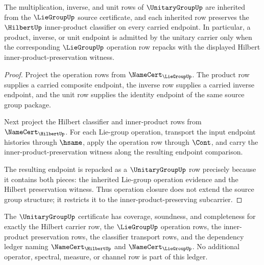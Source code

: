 \begin{theorem}
\label{thm:unitarygroup-operation-preservation-obligation}
The multiplication, inverse, and unit rows of $\UnitaryGroupUp$ are inherited from the $\LieGroupUp$ source certificate, and each inherited row preserves the $\HilbertUp$ inner-product classifier on every carried endpoint. In particular, a product, inverse, or unit endpoint is admitted by the unitary carrier only when the corresponding $\LieGroupUp$ operation row repacks with the displayed Hilbert inner-product-preservation witness.
\end{theorem}

\begin{proof}
Project the operation rows from $\NameCert_{\LieGroupUp}$. The product row supplies a carried composite endpoint, the inverse row supplies a carried inverse endpoint, and the unit row supplies the identity endpoint of the same source group package.

Next project the Hilbert classifier and inner-product rows from $\NameCert_{\HilbertUp}$. For each Lie-group operation, transport the input endpoint histories through $\hsame$, apply the operation row through $\Cont$, and carry the inner-product-preservation witness along the resulting endpoint comparison.

The resulting endpoint is repacked as a $\UnitaryGroupUp$ row precisely because it contains both pieces: the inherited Lie-group operation evidence and the Hilbert preservation witness. Thus operation closure does not extend the source group structure; it restricts it to the inner-product-preserving subcarrier.
\end{proof}

\begin{theorem}
\label{thm:unitarygroup-stability-ledger-exactness-obligation}
The $\UnitaryGroupUp$ certificate has coverage, soundness, and completeness for exactly the Hilbert carrier row, the $\LieGroupUp$ operation rows, the inner-product preservation rows, the classifier transport rows, and the dependency ledger naming $\NameCert_{\HilbertUp}$ and $\NameCert_{\LieGroupUp}$. No additional operator, spectral, measure, or channel row is part of this ledger.
\end{theorem}

